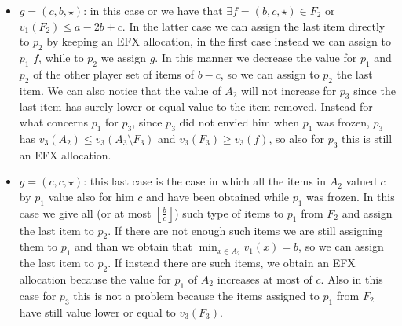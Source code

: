 \documentclass{article}
\newcommand{\floor}[3][2]{\left \lfloor\frac{#2}{#3}\right \rfloor}
\begin{document}
\begin{itemize}
    \item $g = (c,b,\star)$: in this case or we have that $\exists f=(b,c,\star)\in F_2$ or $v_1(F_2) \le a-2b + c$. In the latter case we can assign the last item directly to $p_2$ by keeping an EFX allocation, in the first case instead we can assign to $p_1$ $f$, while to $p_2$ we assign $g$. In this manner we decrease the value for $p_1$ and $p_2$ of the other player set of items of $b-c$, so we can assign to $p_2$ the last item. We can also notice that the value of $A_2$ will not increase for $p_3$ since the last item has surely lower or equal value to the item removed. Instead for what concerns $p_1$ for $p_3$, since $p_3$ did not envied him when $p_1$ was frozen, $p_3$ has $v_3(A_2)\le v_3(A_3\setminus F_3)$ and $v_3(F_3)\ge v_3(f)$, so also for $p_3$ this is still an EFX allocation.
    \item $g = (c,c,\star)$: this last case is the case in which all the items in $A_2$ valued $c$ by $p_1$ value also for him $c$ and have been obtained while $p_1$ was frozen. In this case we give all (or at most $\floor{b}{c}$) such type of items to $p_1$ from $F_2$ and assign the last item to $p_2$. If there are not enough such items we are still assigning them to $p_1$ and than we obtain that $\min_{x \in A_2} v_1(x) = b $, so we can assign the last item to $p_2$. If instead there are such items, we obtain an EFX allocation because the value for $p_1$ of $A_2$ increases at most of $c$. Also in this case for $p_3$ this is not a problem because the items assigned to $p_1$ from $F_2$ have still value lower or equal to $v_3(F_3)$.
\end{itemize}
\end{document}
